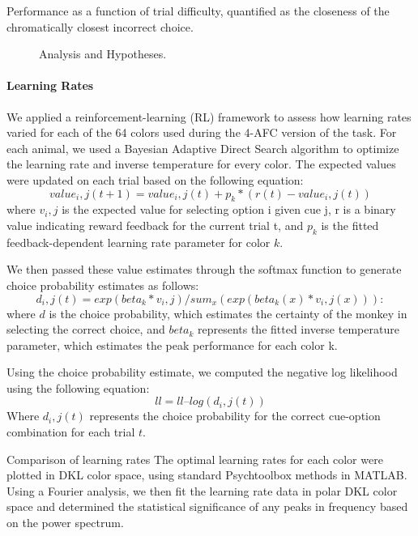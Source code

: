 %
Performance as a function of trial difficulty, quantified as the closeness of the chromatically closest incorrect choice.

\begin{figure}

\caption{Analysis and Hypotheses.} 
\label{fig:BiasCalculation}
\end{figure}

\paragraph{Learning Rates}

We applied a reinforcement-learning (RL) framework to assess how learning rates varied for each of the 64 colors used during the 4-AFC version of the task. For each animal, we used a Bayesian Adaptive Direct Search algorithm to optimize the learning rate and inverse temperature for every color.
The expected values were updated on each trial based on the following equation:
$$value_i,j(t+1) = value_i,j(t)+p_k*(r(t)-value_i,j(t))$$
where $v_i,j$ is the expected value for selecting option i given cue j, r is a binary value indicating reward feedback for the current trial t, and $p_k$ is the fitted feedback-dependent learning rate parameter for color $k$.

We then passed these value estimates through the softmax function to generate choice probability estimates as follows:
$$d_i,j(t) = exp(beta_k * v_i,j) / sum_x(exp(beta_k(x) * v_i,j(x))): $$
where $d$ is the choice probability, which estimates the certainty of the monkey in selecting the correct choice, and $beta_k$ represents the fitted inverse temperature parameter, which estimates the peak performance for each color k.

Using the choice probability estimate, we computed the negative log likelihood using the following equation:
$$ll = ll – log(d_i,j(t))$$
Where $d_i,j(t)$ represents the choice probability for the correct cue-option combination for each trial $t$.

Comparison of learning rates
The optimal learning rates for each color were plotted in DKL color space, using standard Psychtoolbox methods in MATLAB. Using a Fourier analysis, we then fit the learning rate data in polar DKL color space and determined the statistical significance of any peaks in frequency based on the power spectrum. 